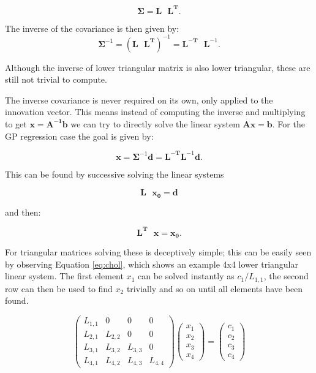 \documentclass[a4paper,11pt]{report}
\begin{document}
\begin{equation}
\boldsymbol{\Sigma} = \mathbf{L} \text{ }\mathbf{L^T}.
\end{equation}

The inverse of the covariance is then given by:
\begin{equation}
\boldsymbol{\Sigma}^{-1} = ( \mathbf{L} \text{ }\mathbf{L^T} )^{-1} = \mathbf{L^{-T}} \text{ }\mathbf{L}^{-1}.
\end{equation}

Although the inverse of  lower triangular matrix is also lower triangular, these are still not trivial to compute. \par

The inverse covariance is never required on its own, only applied to the innovation vector. This means instead of computing the inverse and multiplying to get \(\mathbf{x=A^{-1}b}\) we can try to directly solve the linear system \(\mathbf{Ax=b}\). For the GP regression case the goal is given by:

\begin{equation}
\mathbf{x} = \boldsymbol{\Sigma}^{-1} \mathbf{d} = \mathbf{L^{-T}}\mathbf{L}^{-1}  \mathbf{d}.
\end{equation}

This can be found by successive solving the linear systems

\singlespacing
\begin{equation}
\mathbf{L \text{ } x_0}=  \mathbf{d}
\end{equation}

and then:

\begin{equation}
\mathbf{L^T \text{ } x}=  \mathbf{x_0}.
\end{equation}
\doublespacing

For triangular matrices solving these is deceptively simple; this can be easily seen by observing Equation \ref{eq:chol}, which shows an example 4x4 lower triangular linear system. The first element \(x_1\) can be solved instantly as \(c_1/L_{1,1}\), the second row can then be used to find \(x_2\) trivially and so on until all elements have been found.

\begin{equation} \label{eq:chol}
\left( \begin{array}{cccc}
L_{1,1} & 0  & 0  & 0  \\
L_{2,1} & L_{2,2}  &  0  & 0  \\
L_{3,1} & L_{3,2} & L_{3,3}  &0  \\
L_{4,1} & L_{4,2} &  L_{4,3} & L_{4,4}   \end{array} \right) \left( \begin{array}{cccc}
x_1  \\
x_2  \\
x_3  \\
x_4  \end{array} \right) = \left( \begin{array}{cccc}
c_1  \\
c_2  \\
c_3  \\
c_4  \end{array} \right) 
\end{equation}
\end{document}
